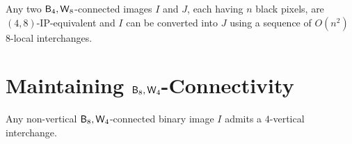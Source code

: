\documentclass[lotsofwhite,charterfonts]{patmorin}
\newcommand{\foureight}{\ensuremath{\protect\textup{\textsf{B}}_{4},\protect\textup{\textsf{W}}_{8}}}
\newcommand{\eightfour}{\ensuremath{\protect\textup{\textsf{B}}_{8},\protect\textup{\textsf{W}}_{4}}}
\begin{document}
\begin{thm}
Any two \foureight-connected images $I$ and $J$, each having $n$ black
pixels, are $(4,8)$-IP-equivalent and $I$ can be converted into $J$ using a
sequence of $O(n^2)$ 8-local interchanges.
\end{thm}
 



\section{Maintaining \eightfour-Connectivity}


\begin{lem}
Any  non-vertical $\eightfour$-connected binary image $I$ admits a $4$-vertical interchange.
\end{lem}
\end{document}
